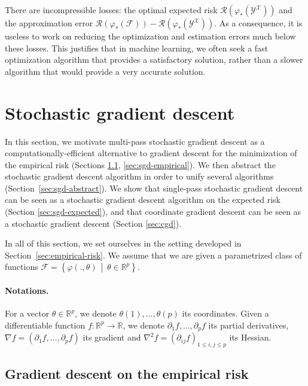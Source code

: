 \documentclass[11pt,reqno]{article}
\newcommand{\R}{\mathbb{R}}
\newcommand{\cF}{\mathcal{F}}
\newcommand{\cX}{\mathcal{X}}
\newcommand{\cY}{\mathcal{Y}}
\newcommand{\cR}{\mathcal{R}}
\renewcommand{\leq}{\leqslant}
\numberwithin{equation}{section}
\theoremstyle{plain}
\theoremstyle{definition}
\theoremstyle{remark}
\begin{document}
There are incompressible losses: the optimal expected risk $\cR(\varphi_*(\cY^\cX))$ and the approximation error $\cR(\varphi_*(\cF)) - \cR(\varphi_*(\cY^\cX))$. As a consequence, it is useless to work on reducing the optimization and estimation errors much below these losses. This justifies that in machine learning, we often seek a fast optimization algorithm that provides a satisfactory solution, rather than a slower algorithm that would provide a very accurate solution. 


\section{Stochastic gradient descent}
\label{sec:sgd}

In this section, we motivate multi-pass stochastic gradient descent as a computationally-efficient alternative to gradient descent for the minimization of the empirical risk (Sections \ref{sec:gd}, \ref{sec:sgd-empirical}). We then abstract the stochastic gradient descent algorithm in order to unify several algorithms (Section~\ref{sec:sgd-abstract}). We show that single-pass stochastic gradient descent can be seen as a stochastic gradient descent algorithm on the expected risk (Section \ref{sec:sgd-expected}), and that coordinate gradient descent can be seen as a stochastic gradient descent (Section \ref{sec:cgd}).

In all of this section, we set ourselves in the setting developed in Section~\ref{sec:empirical-risk}. We assume that we are given a parametrized class of functions $\cF = \left\{\varphi(., \theta) \, \middle\vert \, \theta \in \R^p\right\}$. 

\paragraph{Notations.} For a vector $\theta \in \R^p$, we denote $\theta(1), \dots, \theta(p)$ its coordinates. Given a differentiable function $f:\R^p \to \R$, we denote $\partial_1 f, \dots, \partial_p f$ its partial derivatives, $\nabla f = (\partial_1 f, \dots, \partial_p f)$ its gradient and $\nabla^2 f = (\partial_{ij} f)_{1 \leq i,j \leq p}$ its Hessian.


\subsection{Gradient descent on the empirical risk}
\label{sec:gd}
\end{document}
